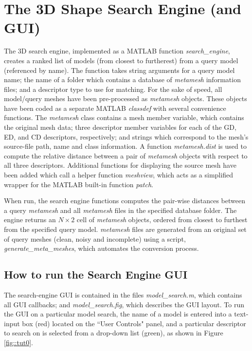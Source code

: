 \documentclass[12pt]{article}
\begin{document}
\section*{The 3D Shape Search Engine (and GUI)}

	\noindent
	The 3D search engine, implemented as a MATLAB function \emph{search\_engine}, creates a ranked list of models (from closest to furtherest) from a query model (referenced by name). The function takes string arguments for a query model name; the name of a folder which contains a database of \emph{metamesh} information files; and a descriptor type to use for matching. For the sake of speed, all model/query meshes have been pre-processed as \emph{metamesh} objects. These objects have been coded as a separate MATLAB \emph{classdef} with several convenience functions. The \emph{metamesh} class contains a mesh member variable, which contains the original mesh data; three descriptor member variables for each of the GD, ED, and CD descriptors, respectively; and strings which correspond to the mesh's source-file path, name and class information. A function \emph{metamesh.dist} is used to compute the relative distance between a pair of \emph{metamesh} objects with respect to all three descriptors. Additional functions for displaying the source mesh have been added which call a helper function \emph{meshview}, which acts as a simplified wrapper for the MATLAB built-in function \emph{patch}.

	\noindent
	When run, the search engine functions computes the pair-wise distances between a query \emph{metamesh} and all \emph{metamesh} files in the specified database folder. The engine returns an $N\times2$ cell of \emph{metamesh} objects, ordered from closest to furthest from the specified query model. \emph{metamesh} files are generated from an original set of query meshes (clean, noisy and incomplete) using a script, \emph{generate\_meta\_meshes}, which automates the conversion process.


	\subsection*{How to run the Search Engine GUI}

	\noindent
	The search-engine GUI is contained in the files \emph{model\_search.m}, which contains all GUI callbacks; and \emph{model\_search.fig}, which describes the GUI layout. To run the GUI on a particular model search, the name of a model is entered into a text-input box (red) located on the ``User Controls" panel, and a particular descriptor to search on is selected from a drop-down list (green), as shown in Figure \ref{fig::tut0}.
	
\end{document}
